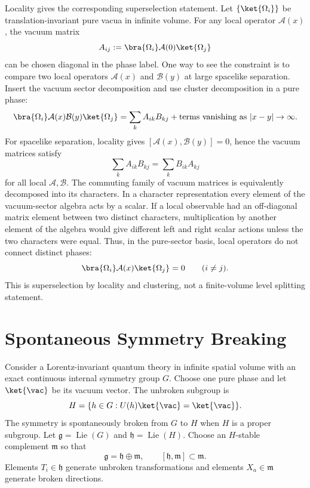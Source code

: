 Locality gives the corresponding superselection statement.  Let
\(\{\ket{\Omega_i}\}\) be translation-invariant pure vacua in infinite volume.
For any local operator \(\mathcal A(x)\), the vacuum matrix
\[
  A_{ij}:=\bra{\Omega_i}\mathcal A(0)\ket{\Omega_j}
\]
can be chosen diagonal in the phase label.  One way to see the constraint is
to compare two local operators \(\mathcal A(x)\) and \(\mathcal B(y)\) at
large spacelike separation.  Insert the vacuum sector decomposition and use
cluster decomposition in a pure phase:
\[
  \bra{\Omega_i}\mathcal A(x)\mathcal B(y)\ket{\Omega_j}
  =
  \sum_k A_{ik}B_{kj}+\hbox{terms vanishing as }|x-y|\to\infty .
\]
For spacelike separation, locality gives
\([\mathcal A(x),\mathcal B(y)]=0\), hence the vacuum matrices satisfy
\[
  \sum_k A_{ik}B_{kj}=\sum_k B_{ik}A_{kj}
\]
for all local \(\mathcal A,\mathcal B\).  The commuting family of vacuum
matrices is equivalently decomposed into its characters.  In a character
representation every element of the vacuum-sector algebra acts by a scalar.  If
a local observable had an off-diagonal matrix element between two distinct
characters, multiplication by another element of the algebra would give
different left and right scalar actions unless the two characters were equal.
Thus, in the pure-sector basis, local operators do not connect distinct phases:
\[
  \bra{\Omega_i}\mathcal A(x)\ket{\Omega_j}=0
  \qquad (i\ne j).
\]
This is superselection by locality and clustering, not a finite-volume level
splitting statement.

\section{Spontaneous Symmetry Breaking}

\begin{definition}
\label{def:internal-ssb-datum}
Consider a Lorentz-invariant quantum theory in infinite spatial volume with an
exact continuous internal symmetry group \(G\).  Choose one pure phase and let
\(\ket{\vac}\) be its vacuum vector.  The unbroken subgroup is
\[
  H
  =
  \{h\in G:U(h)\ket{\vac}=\ket{\vac}\}.
\]
The symmetry is spontaneously broken from \(G\) to \(H\) when \(H\) is a proper
subgroup.  Let \(\mathfrak g=\operatorname{Lie}(G)\) and
\(\mathfrak h=\operatorname{Lie}(H)\).  Choose an \(H\)-stable complement
\(\mathfrak m\) so that
\[
  \mathfrak g=\mathfrak h\oplus\mathfrak m,
  \qquad
  [\mathfrak h,\mathfrak m]\subset\mathfrak m .
\]
Elements \(T_i\in\mathfrak h\) generate unbroken transformations and elements
\(X_a\in\mathfrak m\) generate broken directions.
\end{definition}

